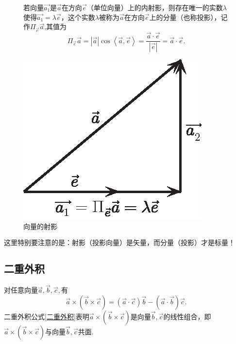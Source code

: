 \begin{figure}[h]
	\begin{minipage}{0.65\linewidth}
		\hspace*{0.3cm} 若向量$\overrightarrow{a_1}$是$\overrightarrow{a}$在方向$\overrightarrow{e}$（单位向量）上的内射影，则存在唯一的实数$\lambda $使得$\overrightarrow{a_1}=\lambda \overrightarrow{e}$，这个实数$\lambda $被称为$\overrightarrow{a}$在方向$\overrightarrow{e}$上的{\color{dy}分量（也称投影）}，记作$\Pi_{\overrightarrow{e}}\overrightarrow{a}$,其值为
		\begin{equation}
			\Pi_ {\overrightarrow{e}}\overrightarrow{a}=|\overrightarrow{a}|\cos \left\langle \overrightarrow{a},\overrightarrow{e}\right\rangle=\frac{\overrightarrow{a}\cdot \overrightarrow{e}}{|\overrightarrow{e}|}=\overrightarrow{a}\cdot \overrightarrow{e}.
		\end{equation}
		
	\end{minipage}
	\hfill
	\begin{minipage}{0.35\linewidth}
		\centering
		\includegraphics[width=0.7\linewidth]{picture/C-1/1.2/TY.eps}
		\caption{向量的射影}
		\label{TY}
	\end{minipage}
\end{figure}
这里特别要注意的是：射影（投影向量）是矢量，而分量（投影）才是标量！\\
\vspace*{-2em}
\subsection{二重外积}

\ttheorem[二重外积公式]
对任意向量$\overrightarrow{a},\overrightarrow{b},\overrightarrow{c},$有
\begin{equation}
	\overrightarrow{a}\times\left( \overrightarrow{b}\times\overrightarrow{c}\right) =\left( \overrightarrow{a}\cdot \overrightarrow{c}\right)\overrightarrow{b}-\left( \overrightarrow{a}\cdot  \overrightarrow{b}\right)\overrightarrow{c}.  
	\label{二重外积}
\end{equation}
\qquad  二重外积公式\eqref{二重外积}表明$\overrightarrow{a}\times\left( \overrightarrow{b}\times\overrightarrow{c}\right)$是向量$\overrightarrow{b},\overrightarrow{c}$的线性组合，即$\overrightarrow{a}\times\left( \overrightarrow{b}\times\overrightarrow{c}\right)$与向量$\overrightarrow{b},\overrightarrow{c}$共面. 

